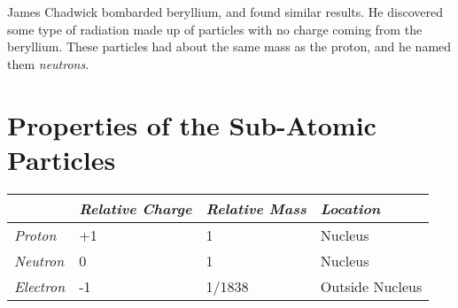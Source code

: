 James Chadwick bombarded beryllium, and found similar results. He
discovered some type of radiation made up of particles with no charge
coming from the beryllium. These particles had about the same mass as
the proton, and he named them \emph{neutrons}.

\hypertarget{properties-of-the-sub-atomic-particles}{%
\section{Properties of the Sub-Atomic
Particles}\label{properties-of-the-sub-atomic-particles}}

\begin{longtable}[]{@{}llll@{}}
\toprule
& \emph{Relative Charge} & \emph{Relative Mass} &
\emph{Location}\tabularnewline
\midrule
\endhead
\emph{Proton} & +1 & 1 & Nucleus\tabularnewline
\emph{Neutron} & 0 & 1 & Nucleus\tabularnewline
\emph{Electron} & -1 & 1/1838 & Outside Nucleus\tabularnewline
\bottomrule
\end{longtable}
